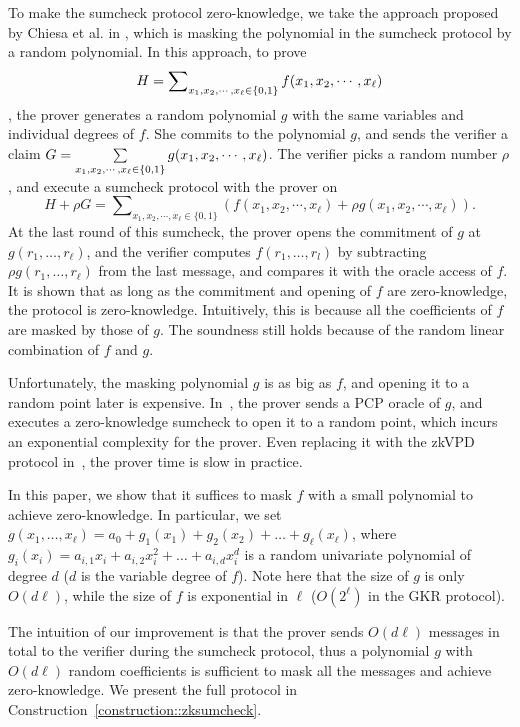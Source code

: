 To make the sumcheck protocol zero-knowledge, we take the approach proposed by Chiesa et al. in \cite{zksumcheck}, which is masking the polynomial in the sumcheck protocol by a random polynomial. In this approach, to prove 
$$H = \sum\nolimits_{x_1, x_2, \cdots, x_\ell \in \{0,1\}}f(x_1, x_2, \cdots, x_\ell)$$
, the prover generates a random polynomial $g$ with the same variables and individual degrees of $f$. She commits to the polynomial $g$, and sends the verifier a claim $G = \sum\limits_{x_1, x_2, \cdots, x_\ell \in \{0,1\}}g(x_1, x_2, \cdots, x_\ell)$. The verifier picks a random number $\rho$, and execute a sumcheck protocol with the prover on $$H + \rho G = \sum\nolimits_{x_1, x_2, \cdots, x_\ell \in \{0, 1\}}(f(x_1, x_2, \cdots, x_\ell) + \rho g(x_1, x_2, \cdots, x_\ell)).$$ At the last round of this sumcheck, the prover opens the commitment of $g$ at $g(r_1, \ldots, r_\ell)$, and the verifier computes $f(r_1, \ldots, r_l)$ by subtracting $\rho g(r_1, \ldots, r_\ell)$ from the last message, and compares it with the oracle access of $f$. It is shown that as long as the commitment and opening of $f$ are zero-knowledge, the protocol is zero-knowledge. Intuitively, this is because all the coefficients of $f$ are masked by those of $g$. The soundness still holds because of the random linear combination of $f$ and $g$. 

Unfortunately, the masking polynomial $g$ is as big as $f$, and opening it to a random point later is expensive. In~\cite{zksumcheck}, the prover sends a PCP oracle of $g$, and executes a zero-knowledge sumcheck to open it to a random point, which incurs an exponential complexity for the prover. Even replacing it with the zkVPD protocol in~\cite{zkvpd}, the prover time is slow in practice.

In this paper, we show that it suffices to mask $f$ with a small polynomial to achieve zero-knowledge. In particular, we set $g(x_1, \ldots, x_\ell) = a_{0} + g_1(x_1) + g_2(x_2) + \ldots + g_\ell(x_\ell)$, where $g_{i}(x_i) = a_{i,1}x_i + a_{i,2}x_i^2 + \ldots + a_{i,d}x_i^d$ is a random univariate polynomial of degree $d$ ($d$ is the variable degree of $f$). Note here that the size of $g$ is only $O(d\ell)$, while the size of $f$ is exponential in $\ell$ ($O(2^\ell)$ in the GKR protocol).

The intuition of our improvement is that the prover sends $O(d\ell)$ messages in total to the verifier during the sumcheck protocol, thus a polynomial $g$ with $O(d\ell)$ random coefficients is sufficient to mask all the messages and achieve zero-knowledge. We present the full protocol in Construction~\ref{construction::zksumcheck}.


